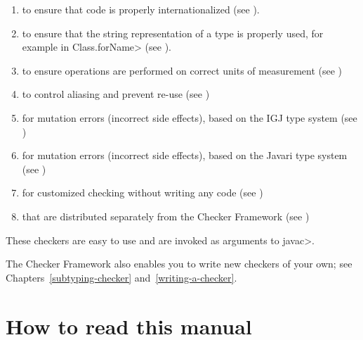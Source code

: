 \begin{enumerate}
\item
   to
  ensure that code is properly internationalized (see
  ).
\item
   to ensure that the
  string representation of a type is properly used, for example in
  \<Class.forName> (see ).
\item
   to ensure operations are
  performed on correct units of measurement
  (see )
\item
   to control aliasing and prevent
  re-use (see )
\item
   for mutation errors (incorrect
  side effects), based on the IGJ type system (see
  )
\item
   for mutation errors
  (incorrect side effects), based on the Javari type system (see
  )
\item
   for customized checking without
  writing any code (see )
\item
   that are distributed
  separately from the Checker Framework
  (see )

\end{enumerate}

\noindent
These checkers are easy to use and are invoked as arguments to \<javac>.


The Checker Framework also enables you to write new checkers of your
own; see Chapters~\ref{subtyping-checker} and~\ref{writing-a-checker}.


\section{How to read this manual\label{how-to-read-this-manual}}

